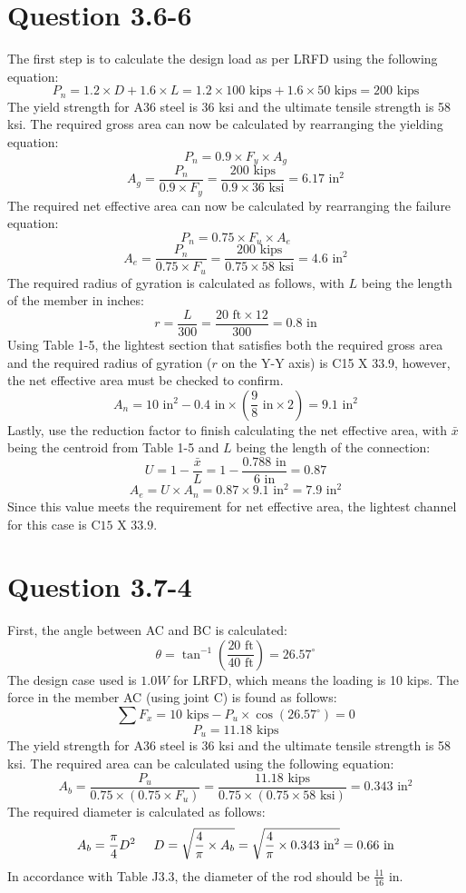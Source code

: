 \documentclass{article}
\begin{document}
\section*{Question 3.6-6}
The first step is to calculate the design load as per LRFD using the following equation: 
\[P_n = 1.2\times D+1.6\times L=1.2\times 100 \text{ kips}+1.6\times50\text{ kips}=200\text{ kips}\]
The yield strength for A36 steel is 36 ksi and the ultimate tensile strength is 58 ksi. The required gross area can now be calculated by rearranging the yielding equation: 
\[P_n=0.9\times F_y\times A_g\] 
\[A_g=\frac{P_n}{0.9\times F_y}=\frac{200\text{ kips}}{0.9\times 36\text{ ksi}}=6.17\text{ in}^2\] 
The required net effective area can now be calculated by rearranging the failure equation: 
\[P_n=0.75\times F_u\times A_e\] 
\[A_e=\frac{P_n}{0.75\times F_u}=\frac{200\text{ kips}}{0.75\times 58\text{ ksi}}=4.6\text{ in}^2\] 
The required radius of gyration is calculated as follows, with $L$ being the length of the member in inches: 
\[r=\frac{L}{300}=\frac{20\text{ ft}\times 12}{300}=0.8\text{ in}\]
Using Table 1-5, the lightest section that satisfies both the required gross area and the required radius of gyration ($r$ on the Y-Y axis) is C15 X 33.9, however, the net effective area must be checked to confirm.
\[A_n=10\text{ in}^2-0.4\text{ in}\times\left(\frac{9}{8}\text{ in}\times 2\right)=9.1\text{ in}^2\]
Lastly, use the reduction factor to finish calculating the net effective area, with $\bar{x}$ being the centroid from Table 1-5 and $L$ being the length of the connection: 
\[U=1-\frac{\bar{x}}{L}=1-\frac{0.788\text{ in}}{6\text{ in}}=0.87\] 
\[A_e=U\times A_n=0.87\times9.1\text{ in}^2=7.9\text{ in}^2\] 
Since this value meets the requirement for net effective area, the lightest channel for this case is $\boxed{\text{C15 X 33.9}}$.
\section*{Question 3.7-4}
First, the angle between AC and BC is calculated: 
\[\theta=\tan^{-1}\left(\frac{20\text{ ft}}{40\text{ ft}}\right)=26.57^\circ\] 
The design case used is $1.0W$ for LRFD, which means the loading is 10 kips. The force in the member AC (using joint C) is found as follows: 
\[\sum F_x=10\text{ kips}-P_{u}\times\cos(26.57^\circ)=0\]
\[P_{u}=11.18\text{ kips}\] 
The yield strength for A36 steel is 36 ksi and the ultimate tensile strength is 58 ksi. The required area can be calculated using the following equation: 
\[A_b=\frac{P_u}{0.75\times(0.75\times F_u)}=\frac{11.18\text{ kips}}{0.75\times(0.75\times 58\text{ ksi})}=0.343\text{ in}^2\] 
The required diameter is calculated as follows: 
\[A_b=\frac{\pi}{4}D^2\hspace{5mm}D=\sqrt{\frac{4}{\pi}\times A_b}=\sqrt{\frac{4}{\pi}\times 0.343\text{ in}^2}=0.66\text{ in}\]
In accordance with Table J3.3, the diameter of the rod should be $\boxed{\frac{11}{16}\text{ in}}$.
\end{document}
